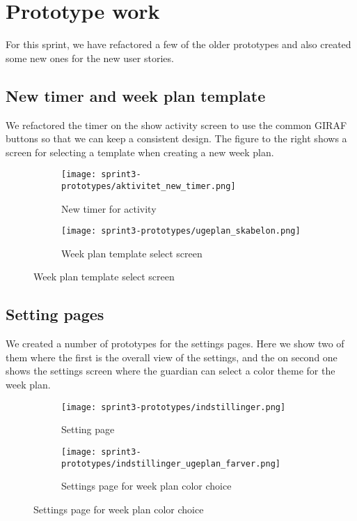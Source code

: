 \section{Prototype work}
For this sprint, we have refactored a few of the older prototypes and also created some new ones for the new user stories.

\subsection{New timer and week plan template}
We refactored the timer on the show activity screen to use the common GIRAF buttons so that we can keep a consistent design. The figure to the right shows a screen for selecting a template when creating a new week plan.
\begin{figure}[H]
    \begin{subfigure}{0.5\textwidth}
    \texttt{[image: sprint3-prototypes/aktivitet\_new\_timer.png]}
    \caption{New timer for activity}
    \label{fig:activity_new_timer}
    \end{subfigure}
    \begin{subfigure}{0.5\textwidth}
        \texttt{[image: sprint3-prototypes/ugeplan\_skabelon.png]}
    \caption{Week plan template select screen}
    \label{fig:weekplan_template_screen}
    \end{subfigure} 
\end{figure}

\subsection{Setting pages}
We created a number of prototypes for the settings pages. Here we show two of them where the first is the overall view of the settings, and the on second one shows the settings screen where the guardian can select a color theme for the week plan.
\begin{figure}[H]
    \begin{subfigure}{0.5\textwidth}
    \texttt{[image: sprint3-prototypes/indstillinger.png]} 
    \caption{Setting page}
    \label{fig:settings}
    \end{subfigure}
    \begin{subfigure}{0.5\textwidth}
        \texttt{[image: sprint3-prototypes/indstillinger\_ugeplan\_farver.png]}
    \caption{Settings page for week plan color choice}
    \label{fig:settings_color_choice}
    \end{subfigure} 
\end{figure}

